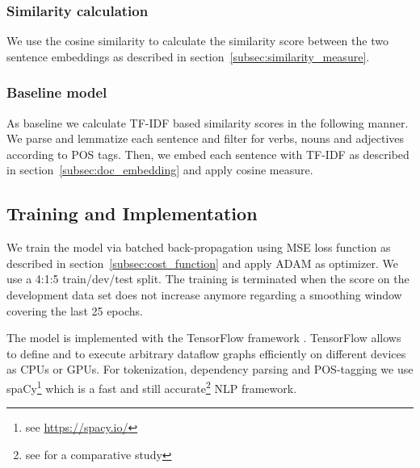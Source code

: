 \subsubsection{Similarity calculation}
We use the cosine similarity to calculate the similarity score between the two sentence embeddings as described in section~\ref{subsec:similarity_measure}.

\subsubsection{Baseline model}
As baseline we calculate TF-IDF based similarity scores in the following manner. We parse and lemmatize each sentence and filter for verbs, nouns and adjectives according to POS tags. Then, we embed each sentence with TF-IDF as described in section~\ref{subsec:doc_embedding} and apply cosine measure. 

\subsection{Training and Implementation}
\label{subesec:training_implementation}
We train the model via batched back-propagation using \ac{MSE} loss function as described in section~\ref{subsec:cost_function} and apply ADAM \autocite{kingma_adam_2014} %
as optimizer. We use a 4:1:5 train/dev/test split. The training is terminated when the score on the development data set does not increase anymore regarding a smoothing window covering the last 25 epochs.

The model is implemented with the TensorFlow framework  \autocite{abadi_tensorflow_2016}. TensorFlow allows to define and to execute arbitrary dataflow graphs efficiently on different devices as CPUs or GPUs. For tokenization, dependency parsing and POS-tagging we use spaCy\footnote{see \url{https://spacy.io/}} which is a fast and still accurate\footnote{see \textcite{choi_it_2015} for a comparative study} \ac{NLP} framework. 






